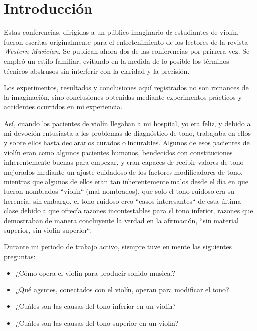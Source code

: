\chapter*{Introducción}
Estas conferencias, dirigidas a un público imaginario de estudiantes de violín, fueron escritas originalmente para el entretenimiento de los lectores de la revista \emph{Western Musician}. Se publican ahora dos de las conferencias por primera vez. Se empleó un estilo familiar, evitando en la medida de lo posible los términos técnicos abstrusos sin interferir con la claridad y la precisión.

Los experimentos, resultados y conclusiones aquí registrados no son romances de la imaginación, sino conclusiones obtenidas mediante experimentos prácticos y accidentes ocurridos en mi experiencia. 

Así, cuando los pacientes de violín llegaban a mi hospital, yo era feliz, y debido a mi devoción entusiasta a los problemas de diagnóstico de tono, trabajaba en ellos y sobre ellos hasta declararlos curados o incurables. Algunos de esos pacientes de violín eran como algunos pacientes humanos, bendecidos con constituciones inherentemente buenas para empezar, y eran capaces de recibir valores de tono mejorados mediante un ajuste cuidadoso de los factores modificadores de tono, mientras que algunos de ellos eran tan inherentemente malos desde el día en que fueron nombrados ``violín`` (mal nombrados), que solo el tono ruidoso era su herencia; sin embargo, el tono ruidoso creo ``casos interesantes`` de esta última clase debido a que ofrecía razones incontestables para el tono inferior, razones que demostraban de manera concluyente la verdad en la afirmación, ``sin material superior, sin violín superior``.

Durante mi periodo de trabajo activo, siempre tuve en mente las siguientes preguntas:
\begin{itemize}
    \item ¿Cómo opera el violín para producir sonido musical?
    \item ¿Qué agentes, conectados con el violín, operan para modificar el tono?
    \item ¿Cuáles son las causas del tono inferior en un violín?
    \item ¿Cuáles son las causas del tono superior en un violín?
\end{itemize}

